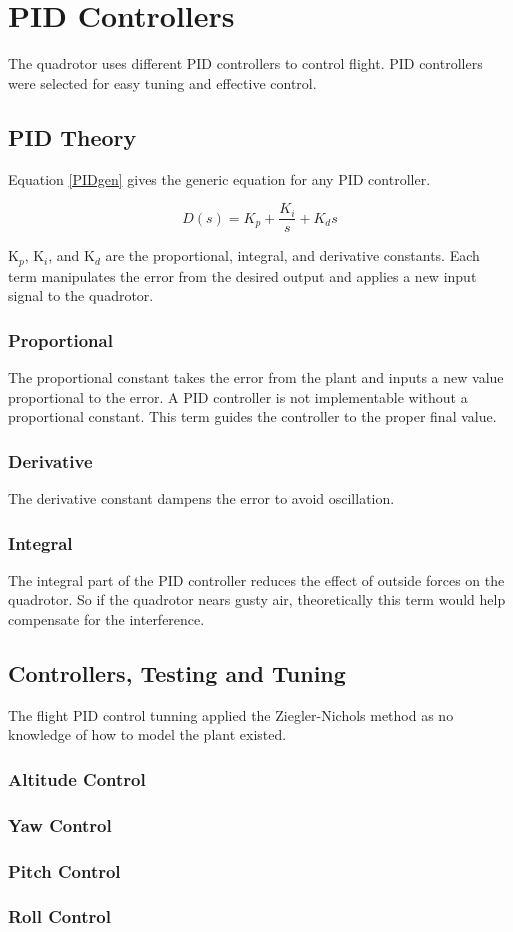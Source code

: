 \section{PID Controllers}


The quadrotor uses different PID controllers to control flight. PID controllers were selected for easy tuning and effective control. 

\subsection{PID Theory}
Equation \ref{PIDgen} gives the generic equation for any PID controller. 

\begin{equation}
D(s) = K_p+\frac{K_i}{s}+K_ds
\label{PIDgen}
\end{equation}

K$_p$, K$_i$, and K$_d$ are the proportional, integral, and derivative constants.  Each term manipulates the error from the desired output and applies a new input signal to the quadrotor. 

\subsubsection{Proportional}
The proportional constant takes the error from the plant and inputs a new value proportional to the error. A PID controller is not implementable without a proportional constant.  This term guides the controller to the proper final value. 

\subsubsection{Derivative}
The derivative constant dampens the error to avoid oscillation. 

\subsubsection{Integral}
The integral part of the PID controller reduces the effect of outside forces on the quadrotor.  So if the quadrotor nears gusty air, theoretically this term would help compensate for the interference. 

\subsection{Controllers, Testing and Tuning}

The flight  PID control tunning applied the Ziegler-Nichols method as no knowledge of how to model the plant existed.
\subsubsection{Altitude Control}
\subsubsection{Yaw Control}
\subsubsection{Pitch Control}
\subsubsection{Roll Control}